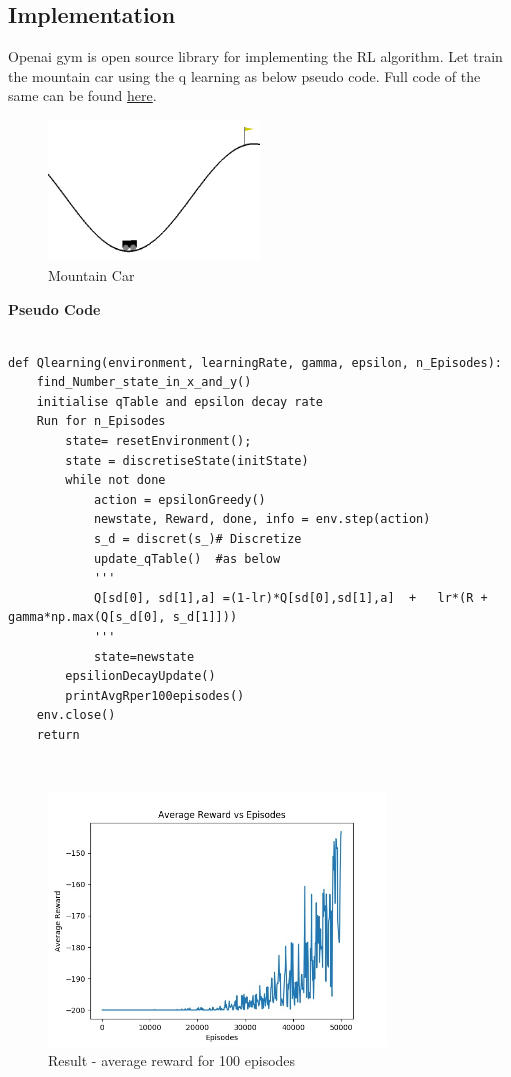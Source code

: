 \subsection{Implementation}
Openai gym is open source library for implementing the RL algorithm.\cite{openai}
Let train the mountain car using the q learning as below pseudo code. Full code of the same can be found \href{https://github.com/iamrajee/Slam_and_RL_BTP/tree/master/code/AI/mountainCar/qlearn}{here}.
\begin{figure}[H]
    \centering
    \includegraphics[width=0.5\textwidth]{images/mountaincar.png}
    \caption{Mountain Car}
\end{figure}


\textbf{Pseudo Code}
\begin{verbatim}

def Qlearning(environment, learningRate, gamma, epsilon, n_Episodes):
    find_Number_state_in_x_and_y()
    initialise qTable and epsilon decay rate
    Run for n_Episodes
        state= resetEnvironment();
        state = discretiseState(initState)
        while not done
            action = epsilonGreedy() 
            newstate, Reward, done, info = env.step(action) 
            s_d = discret(s_)# Discretize
            update_qTable()  #as below
            '''
            Q[sd[0], sd[1],a] =(1-lr)*Q[sd[0],sd[1],a]  +   lr*(R + gamma*np.max(Q[s_d[0], s_d[1]]))
            '''
            state=newstate
        epsilionDecayUpdate()
        printAvgRper100episodes()
    env.close()
    return

\end{verbatim}\\

\newline \begin{figure}[H]
    \centering
    \includegraphics[width=0.8\textwidth]{images/qlearnBest.jpg}
    \caption{Result - average reward for 100 episodes}
\end{figure}\\




